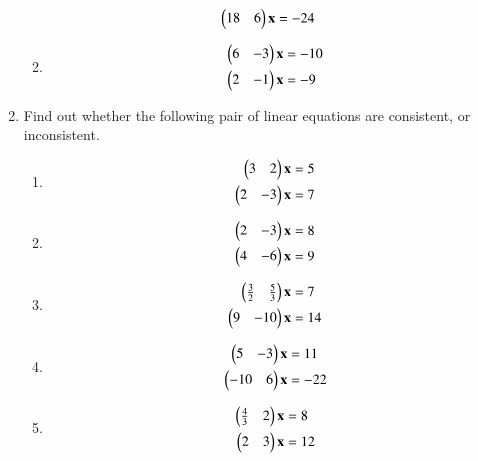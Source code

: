 \begin{enumerate}[label=\arabic*.,ref=\thesubsection.\theenumi]
\begin{enumerate}[itemsep=2pt]
\begin{align}
\begin{split}
\\
\begin{pmatrix}18 & 6 \end{pmatrix}\mathbf{x}&=-24
\end{split}
\end{align}
\item
\begin{align}
\begin{split}
\begin{pmatrix}6 & -3 \end{pmatrix}\mathbf{x}&=-10
\\
\begin{pmatrix}2 & -1 \end{pmatrix}\mathbf{x}&=-9
\end{split}
\end{align}
\end{enumerate}
%
\item Find out whether the following pair of linear
equations are consistent, or inconsistent.
%
\begin{enumerate}[itemsep=2pt]
\item
\begin{align}
\begin{split}
\begin{pmatrix}3 & 2 \end{pmatrix}\mathbf{x}&=5
\\
\begin{pmatrix}2 & -3 \end{pmatrix}\mathbf{x}&=7
\end{split}
\end{align}
\item
\begin{align}
\begin{split}
\begin{pmatrix}2 & -3 \end{pmatrix}\mathbf{x}&=8
\\
\begin{pmatrix}4 & -6 \end{pmatrix}\mathbf{x}&=9
\end{split}
\end{align}
\item
\begin{align}
\begin{split}
\begin{pmatrix}\frac{3}{2} & \frac{5}{3} \end{pmatrix}\mathbf{x}&=7
\\
\begin{pmatrix}9 & -10 \end{pmatrix}\mathbf{x}&=14
\end{split}
\end{align}
\item
\begin{align}
\begin{split}
\begin{pmatrix}5 & -3 \end{pmatrix}\mathbf{x}&=11
\\
\begin{pmatrix}-10 & 6 \end{pmatrix}\mathbf{x}&=-22
\end{split}
\end{align}
\item
\begin{align}
\begin{split}
\myvec{\frac{4}{3} & 2 }\vec{x}&=8
\\
\myvec{2 & 3 }\vec{x}&=12

\end{split}
\end{align}
\end{enumerate}
\end{enumerate}

